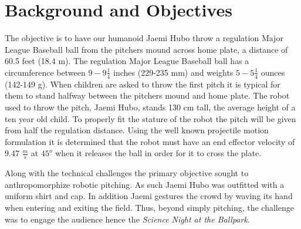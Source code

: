 \section{Background and Objectives}\label{sec:background}

The objective is to have our humanoid Jaemi Hubo throw a regulation Major League Baseball ball from the pitchers mound across home plate, a distance of 60.5 feet (18.4 m).  
The regulation Major League Baseball ball has a circumference between $9 - 9\frac{1}{4}$ inches (229-235 mm) and weights $5-5\frac{1}{4}$ ounces (142-149 g)\cite{mlbrules}.  
When children are asked to throw the first pitch it is typical for them to stand halfway between the pitchers mound and home plate.
The robot used to throw the pitch, Jaemi Hubo, stands 130 cm tall, the average height of a ten year old child.
To properly fit the stature of the robot the pitch will be given from half the regulation distance.
Using the well known projectile motion formulation it is determined that the robot must have an end effector velocity of 9.47 $\frac{m}{s}$ at $45^o$ when it releases the ball in order for it to cross the plate.

Along with the technical challenges the primary objective sought to anthropomorphize robotic pitching.  
As such Jaemi Hubo was outfitted with a uniform shirt and cap.
In addition Jaemi gestures the crowd by waving its hand when entering and exiting the field.
Thus, beyond simply pitching, the challenge was to engage the audience hence the \textit{Science Night at the Ballpark}.





